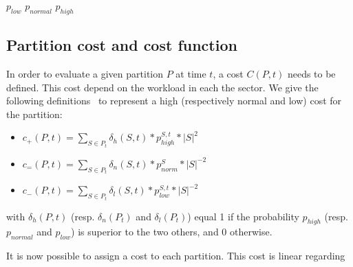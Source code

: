 \documentclass[twoside,twocolumn]{article}
\begin{document}
$p_{low}$
$p_{normal}$
$p_{high}$

\subsection{Partition cost and cost function}

In order to evaluate a given partition $P$ at time $t$, a cost $C(P, t)$ needs
to be defined. This cost depend on the workload in each the sector. We give the
following definitions~\cite{Ferrari2017} to represent a high
(respectively normal and low) cost for the partition:
\begin{itemize}
  \item $c_+(P, t) = \sum_{S \in P_t} \delta_{h}(S, t) * p_{high}^{S, t} * |S|^2$
  \item $c_=(P, t) = \sum_{S \in P_t} \delta_{n}(S, t) * p_{norm}^{S} * |S|^{-2}$
  \item $c_-(P, t) = \sum_{S \in P_t} \delta_{l}(S, t) * p_{low}^{S, t} * |S|^{-2}$
\end{itemize}
with $\delta_{h}(P, t)$ (resp. $\delta_{n}(P_t)$ and $\delta_{l}(P_t)$) equal 1
if the probability $p_{high}$ (resp. $p_{normal}$ and $p_{low}$) is superior to
the two others, and 0 otherwise.

It is now possible to assign a cost to each partition. This cost is linear
regarding




\end{document}
